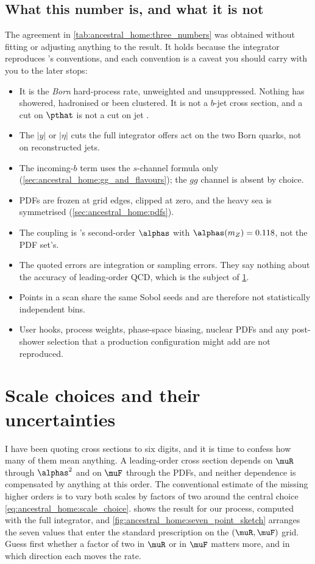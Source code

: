 \subsection{What this number is, and what it is not}
\label{sec:ancestral_home:caveats}

The agreement in \cref{tab:ancestral_home:three_numbers} was obtained without
fitting or adjusting anything to the \PYTHIA result. It holds because the
integrator reproduces \PYTHIA's conventions, and each convention is a caveat
you should carry with you to the later stops:
\begin{itemize}
  \item It is the \emph{Born} hard-process rate, unweighted and unsuppressed.
    Nothing has showered, hadronised or been clustered. It is not a $b$-jet
    cross section, and a cut on $\pthat$ is not a cut on jet \pt.
  \item The $|y|$ or $|\eta|$ cuts the full integrator offers act on the two
    Born quarks, not on reconstructed jets.
  \item The incoming-$b$ term uses the $s$-channel formula only
    (\cref{sec:ancestral_home:gg_and_flavours}); the $gg$ channel is absent by
    choice.
  \item PDFs are frozen at grid edges, clipped at zero, and the heavy sea is
    symmetrised (\cref{sec:ancestral_home:pdfs}).
  \item The coupling is \PYTHIA's second-order $\alphas$ with
    $\alphas(m_Z)=0.118$, not the PDF set's.
  \item The quoted errors are integration or sampling errors. They say nothing
    about the accuracy of leading-order QCD, which is the subject of
    \cref{sec:ancestral_home:scales}.
  \item Points in a \pt scan share the same Sobol seeds and are therefore not
    statistically independent bins.
  \item User hooks, process weights, phase-space biasing, nuclear PDFs and
    any post-shower selection that a production configuration might add are
    not reproduced.
\end{itemize}

\section{Scale choices and their uncertainties}
\label{sec:ancestral_home:scales}

I have been quoting cross sections to six digits, and it is time to confess
how many of them mean anything. A leading-order cross section depends on
$\muR$ through $\alphas^2$ and on $\muF$ through the PDFs, and neither
dependence is compensated by anything at this order. The conventional
estimate of the missing higher orders is to vary both scales by factors of
two around the central choice \cref{eq:ancestral_home:scale_choice}.
 shows the result for our process,
computed with the full integrator, and \cref{fig:ancestral_home:seven_point_sketch}
arranges the seven values that enter the standard prescription on the
$(\muR,\muF)$ grid. Guess first whether a factor of two in $\muR$ or in
$\muF$ matters more, and in which direction each moves the rate.

